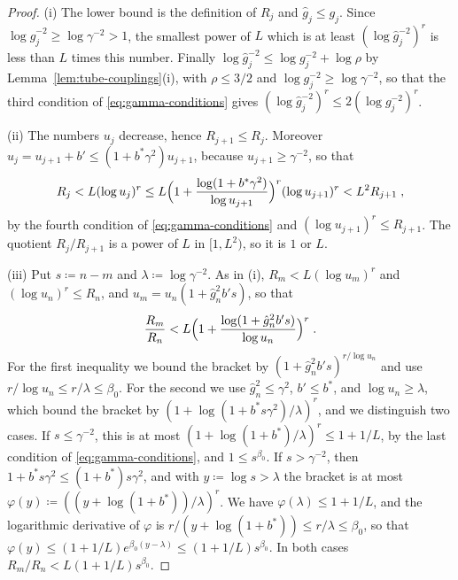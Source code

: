 \documentclass[11pt]{preprint}
\numberwithin{equation}{section}
\theoremstyle{definition}
\theoremstyle{remark}
\theoremstyle{plain}
\begin{document}
\begin{proof}
(i) The lower bound is the definition of $R_j$ and $\hat g_j \leq g_j$. Since $\log\hat g_j^{-2} \geq \log\gamma^{-2} > 1$, the smallest power of $L$ which is at least $(\log\hat g_j^{-2})^r$ is less than $L$ times this number. Finally $\log\hat g_j^{-2} \leq \log g_j^{-2} + \log\rho$ by Lemma~\ref{lem:tube-couplings}(i), with $\rho \leq 3/2$ and $\log g_j^{-2} \geq \log\gamma^{-2}$, so that the third condition of \eqref{eq:gamma-conditions} gives $(\log\hat g_j^{-2})^r \leq 2(\log g_j^{-2})^r$.

(ii) The numbers $u_j$ decrease, hence $R_{j+1} \leq R_j$. Moreover $u_j = u_{j+1} + b' \leq (1 + b^*\gamma^2)u_{j+1}$, because $u_{j+1} \geq \gamma^{-2}$, so that
\begin{equation}\label{eq:tube-cube-ratio}
    R_j < L(\log u_j)^r \leq L\Bigl(1 + \frac{\log(1 + b^*\gamma^2)}{\log u_{j+1}}\Bigr)^r(\log u_{j+1})^r < L^2R_{j+1}\;,
\end{equation}
by the fourth condition of \eqref{eq:gamma-conditions} and $(\log u_{j+1})^r \leq R_{j+1}$. The quotient $R_j/R_{j+1}$ is a power of $L$ in $[1, L^2)$, so it is $1$ or $L$.

(iii) Put $s \coloneqq n - m$ and $\lambda \coloneqq \log\gamma^{-2}$. As in (i), $R_m < L(\log u_m)^r$ and $(\log u_n)^r \leq R_n$, and $u_m = u_n(1 + \hat g_n^2b's)$, so that
\begin{equation}\label{eq:tube-cube-quotient}
    \frac{R_m}{R_n} < L\Bigl(1 + \frac{\log(1 + \hat g_n^2b's)}{\log u_n}\Bigr)^r\;.
\end{equation}
For the first inequality we bound the bracket by $(1 + \hat g_n^2b's)^{r/\log u_n}$ and use $r/\log u_n \leq r/\lambda \leq \beta_0$. For the second we use $\hat g_n^2 \leq \gamma^2$, $b' \leq b^*$, and $\log u_n \geq \lambda$, which bound the bracket by $(1 + \log(1 + b^*s\gamma^2)/\lambda)^r$, and we distinguish two cases. If $s \leq \gamma^{-2}$, this is at most $(1 + \log(1 + b^*)/\lambda)^r \leq 1 + 1/L$, by the last condition of \eqref{eq:gamma-conditions}, and $1 \leq s^{\beta_0}$. If $s > \gamma^{-2}$, then $1 + b^*s\gamma^2 \leq (1 + b^*)s\gamma^2$, and with $y \coloneqq \log s > \lambda$ the bracket is at most $\varphi(y) \coloneqq ((y + \log(1 + b^*))/\lambda)^r$. We have $\varphi(\lambda) \leq 1 + 1/L$, and the logarithmic derivative of $\varphi$ is $r/(y + \log(1 + b^*)) \leq r/\lambda \leq \beta_0$, so that $\varphi(y) \leq (1 + 1/L)e^{\beta_0(y - \lambda)} \leq (1 + 1/L)s^{\beta_0}$. In both cases $R_m/R_n < L(1 + 1/L)s^{\beta_0}$.
\end{proof}
\end{document}
